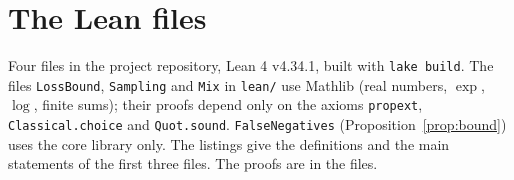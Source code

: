 \documentclass[11pt]{article}
\theoremstyle{definition}
\begin{document}
\appendix
\small

\section{The Lean files}
\label{app:lean}

Four files in the project repository, Lean 4 v4.34.1, built with \texttt{lake build}. The files \texttt{LossBound}, \texttt{Sampling} and \texttt{Mix} in \texttt{lean/} use Mathlib (real numbers, $\exp$, $\log$, finite sums); their proofs depend only on the axioms \texttt{propext}, \texttt{Classical.choice} and \texttt{Quot.sound}. \texttt{FalseNegatives} (Proposition~\ref{prop:bound}) uses the core library only. The listings give the definitions and the main statements of the first three files. The proofs are in the files.




\end{document}
